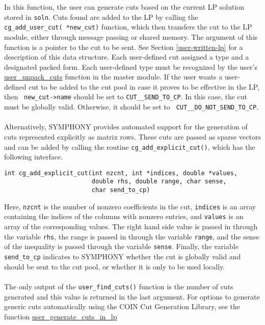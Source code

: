 In this function, the user can generate cuts based on the current LP solution
stored in {\tt soln}. Cuts found are added to the LP by calling the {\tt
cg\_add\_user\_cut( *new\_cut)} function, which
then transfers the cut to the LP module, either through message passing or
shared memory.  The argument of this function is a pointer to the cut to be
sent. See Section \ref{user-written-lp} for a description of this data
structure. Each user-defined cut assigned a type and a designated packed
form. Each user-defined type must be recognized by the user's \hyperref{{\tt
user\_unpack\_cuts()}}{\ptt{user\_unpack\_cuts()}}{}{user_unpack_cuts}
function in the master module. If the user wants a user-defined cut to be
added to the cut pool in case it proves to be effective in the LP, then {\tt
new\_cut->name} should be set to {\tt CUT\_\_SEND\_TO\_CP}. In this case, the
cut must be globally valid. Otherwise, it should be set to {\tt
CUT\_\_DO\_NOT\_SEND\_TO\_CP}. \\
\\
Alternatively, SYMPHONY provides automated support for the generation of cuts
represented explicitly as matrix rows. These cuts are passed as sparse vectors
and can be added by calling the routine \texttt{cg\_add\_explicit\_cut()},
which has the following interface.
\begin{verbatim}
int cg_add_explicit_cut(int nzcnt, int *indices, double *values,
                        double rhs, double range, char sense, 
                        char send_to_cp)
\end{verbatim}
Here, \texttt{nzcnt} is the number of nonzero coefficients in the cut,
\texttt{indices} is an array containing the indices of the columns with
nonzero entries, and \texttt{values} is an array of the corresponding
values. The right hand side value is passed in through the variable
\texttt{rhs}, the range is passed in through the variable \texttt{range}, and
the sense of the inequality is passed through the variable
\texttt{sense}. Finally, the variable \texttt{send\_to\_cp} indicates to
SYMPHONY whether the cut is globally valid and should be sent to the cut pool,
or whether it is only to be used locally.\\
\\
The only output of the \texttt{user\_find\_cuts()} function is the number of
cuts generated and this value is returned in the last argument. For options to
generate generic cuts automatically using the COIN Cut Generation Library, see
the function \hyperref{\ptt{user\_generate\_cuts\_in\_lp()}}{{\tt
user\_generate\_cuts\_in\_lp()}}{}{user_generate_cuts_in_lp}\\
\\

